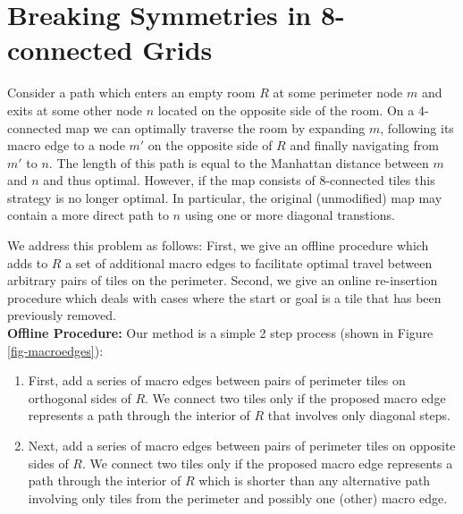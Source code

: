 \section{Breaking Symmetries in 8-connected Grids}


Consider a path which enters an empty room $R$ at some perimeter node $m$ and exits at some other
node $n$ located on the opposite side of the room.
On a 4-connected map we can optimally traverse the room by expanding $m$, following
its macro edge to a node $m'$ on the opposite side of $R$ and finally navigating from $m'$ to $n$.
The length of this path is equal to the Manhattan distance between $m$ and $n$ and thus optimal.
However, if the map consists of 8-connected tiles this strategy is no longer optimal.
In particular, the original (unmodified) map may contain a more direct path to $n$ using one or more diagonal
transtions.
\par
We address this problem as follows:
First, we give an offline procedure which adds to $R$ a set of additional macro edges
to facilitate optimal travel between arbitrary pairs of tiles on the perimeter.
Second, we give an online re-insertion procedure which deals with cases where the start or
goal is a tile that has been previously removed.
\\ \newline
\textbf{Offline Procedure: }
Our method is a simple 2 step process (shown in Figure \ref{fig-macroedges}):

\begin{enumerate}
\item{First, add a series of macro edges between pairs of perimeter tiles on orthogonal sides of $R$. 
We connect two tiles only if the proposed macro edge represents a path through the interior of $R$ that involves
only diagonal steps. }
\item{Next, add a series of macro edges between pairs of perimeter tiles on opposite sides of $R$.
We connect two tiles only if the proposed macro edge represents a path through the interior of $R$ which is shorter
than any alternative path involving only tiles from the perimeter and possibly one (other) macro edge.
}
\end{enumerate}

